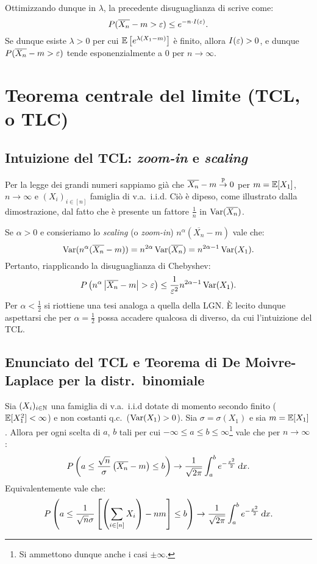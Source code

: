 \begin{multicols*}{2}
Ottimizzando dunque in $\lambda$, la precedente disuguaglianza di scrive come:
\[
    P(\overline{X_n} - m > \varepsilon) \leq e^{-n \cdot I(\varepsilon)}.
\]
Se dunque esiste $\lambda > 0$ per cui $\mathbb{E}\left[e^{\lambda(X_1-m)}\right]$ è finito, allora $I(\varepsilon) > 0$, e dunque $P(\overline{X_n} - m > \varepsilon)$ tende esponenzialmente a $0$
per $n \to \infty$.

\section{Teorema centrale del limite (TCL, o TLC)}

\subsection{Intuizione del TCL: \textit{zoom-in} e \textit{scaling}}
Per la legge dei grandi numeri sappiamo già che
$\overline{X_n} - m \overset{\mathbb{P}}{\to} 0$ per $m = \mathbb{E}[X_1]$, $n \to \infty$ e
$(X_i)_{i \in [n]}$ famiglia di v.a.~i.i.d. Ciò è dipeso, come illustrato dalla dimostrazione, dal fatto che è presente un fattore $\frac{1}{n}$ in $\operatorname{Var}(\overline{X_n})$.
\smallskip


Se $\alpha > 0$ e consieriamo lo \textit{scaling} (o \textit{zoom-in}) $n^\alpha (\overline{X_n} - m)$
vale che:
\[
    \operatorname{Var}(n^\alpha (\overline{X_n} - m)) = n^{2\alpha} \operatorname{Var}(\overline{X_n}) = n^{2\alpha - 1} \operatorname{Var}(X_1). 
\]
Pertanto, riapplicando la disuguaglianza di Chebyshev:
\[
    P\left(n^\alpha \left\lvert \overline{X_n} - m \right\rvert > \varepsilon\right) \leq \frac{1}{\varepsilon^2} n^{2\alpha - 1} \operatorname{Var}(X_1).
\]
Per $\alpha < \frac{1}{2}$ si riottiene una tesi analoga a quella della LGN. È
lecito dunque aspettarsi che per $\alpha = \frac{1}{2}$ possa accadere qualcosa
di diverso, da cui l'intuizione del TCL.

\subsection{Enunciato del TCL e Teorema di De Moivre-Laplace per la distr.~binomiale}
\begin{theorem}
    Sia $(X_i)_{i \in \mathbb{N}}$ una famiglia di v.a.~i.i.d dotate di momento secondo
    finito ($\mathbb{E}[X_1^2] < \infty$) e non costanti q.c.~($\operatorname{Var}(X_1) > 0$). Sia
    $\sigma = \sigma(X_1)$ e sia $m = \mathbb{E}[X_1]$. Allora per ogni scelta di $a$, $b$
    tali per cui $-\infty \leq a \leq b \leq \infty$\footnote{
        Si ammettono dunque anche i casi $\pm \infty$.
    } vale che per $n \to \infty$:
    \[
        P\left(a \leq \frac{\sqrt{n}}{\sigma} \left(\overline{X_n} - m\right) \leq b\right) \to \frac{1}{\sqrt{2\pi}}\int_a^b e^{-\frac{x^2}{2}} \dx. 
    \]
    Equivalentemente vale che:
    \[
        P\left(a \leq \frac{1}{\sqrt{n}\sigma} \left[\left(\sum_{i \in [n]} X_i\right) - nm\right] \leq b\right) \to \frac{1}{\sqrt{2\pi}}\int_a^b e^{-\frac{x^2}{2}} \dx. 
    \]
\end{theorem}


\end{multicols*}
